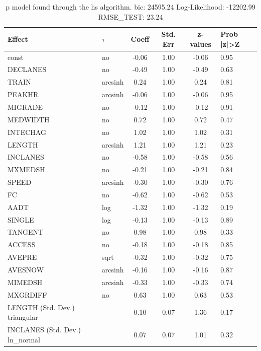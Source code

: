 \begin{table}
	\caption{p model found through the hs algorithm. bic: 24595.24 Log-Likelihood: -12202.99 RMSE_TEST: 23.24}
	\begin{center}
		\begin{tabular}{|l|l|c|c|c|l|}
			\hline
			Effect & $\tau$ & Coeff & Std. Err & z-values & Prob |z|>Z \\
			\hline
			const & no & -0.06 & 1.00 & -0.06 & 0.95 \\
			\hline
			DECLANES & no & -0.49 & 1.00 & -0.49 & 0.63 \\
			\hline
			TRAIN & arcsinh & 0.24 & 1.00 & 0.24 & 0.81 \\
			\hline
			PEAKHR & arcsinh & -0.06 & 1.00 & -0.06 & 0.95 \\
			\hline
			MIGRADE & no & -0.12 & 1.00 & -0.12 & 0.91 \\
			\hline
			MEDWIDTH & no & 0.72 & 1.00 & 0.72 & 0.47 \\
			\hline
			INTECHAG & no & 1.02 & 1.00 & 1.02 & 0.31 \\
			\hline
			LENGTH & arcsinh & 1.21 & 1.00 & 1.21 & 0.23 \\
			\hline
			INCLANES & no & -0.58 & 1.00 & -0.58 & 0.56 \\
			\hline
			MXMEDSH & no & -0.21 & 1.00 & -0.21 & 0.84 \\
			\hline
			SPEED & arcsinh & -0.30 & 1.00 & -0.30 & 0.76 \\
			\hline
			FC & no & -0.62 & 1.00 & -0.62 & 0.53 \\
			\hline
			AADT & log & -1.32 & 1.00 & -1.32 & 0.19 \\
			\hline
			SINGLE & log & -0.13 & 1.00 & -0.13 & 0.89 \\
			\hline
			TANGENT & no & 0.98 & 1.00 & 0.98 & 0.33 \\
			\hline
			ACCESS & no & -0.18 & 1.00 & -0.18 & 0.85 \\
			\hline
			AVEPRE & sqrt & -0.32 & 1.00 & -0.32 & 0.75 \\
			\hline
			AVESNOW & arcsinh & -0.16 & 1.00 & -0.16 & 0.87 \\
			\hline
			MIMEDSH & arcsinh & -0.33 & 1.00 & -0.33 & 0.74 \\
			\hline
			MXGRDIFF & no & 0.63 & 1.00 & 0.63 & 0.53 \\
			\hline
			LENGTH (Std. Dev.) triangular &  & 0.10 & 0.07 & 1.36 & 0.17 \\
			\hline
			INCLANES (Std. Dev.) ln_normal &  & 0.07 & 0.07 & 1.01 & 0.32 \\

\end{tabular}
\end{center}
\end{table}
